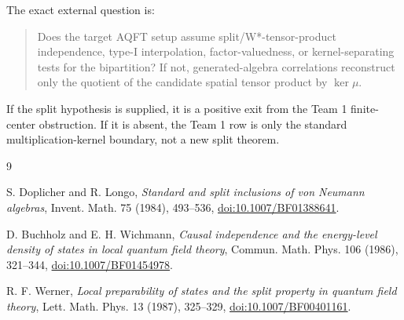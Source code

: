 \documentclass[12pt]{article}
\theoremstyle{remark}
\begin{document}
The exact external question is:

\begin{quote}
Does the target AQFT setup assume split/W*-tensor-product independence, type-I
interpolation, factor-valuedness, or kernel-separating tests for the
bipartition?  If not, generated-algebra correlations reconstruct only the
quotient of the candidate spatial tensor product by \(\ker\mu\).
\end{quote}

If the split hypothesis is supplied, it is a positive exit from the Team 1
finite-center obstruction.  If it is absent, the Team 1 row is only the
standard multiplication-kernel boundary, not a new split theorem.

\begin{thebibliography}{9}

S. Doplicher and R. Longo,
\emph{Standard and split inclusions of von Neumann algebras},
Invent. Math. 75 (1984), 493--536,
\href{https://link.springer.com/article/10.1007/BF01388641}{doi:10.1007/BF01388641}.

D. Buchholz and E. H. Wichmann,
\emph{Causal independence and the energy-level density of states in local quantum field theory},
Commun. Math. Phys. 106 (1986), 321--344,
\href{https://link.springer.com/article/10.1007/BF01454978}{doi:10.1007/BF01454978}.

R. F. Werner,
\emph{Local preparability of states and the split property in quantum field theory},
Lett. Math. Phys. 13 (1987), 325--329,
\href{https://link.springer.com/article/10.1007/BF00401161}{doi:10.1007/BF00401161}.

\end{thebibliography}
\end{document}

